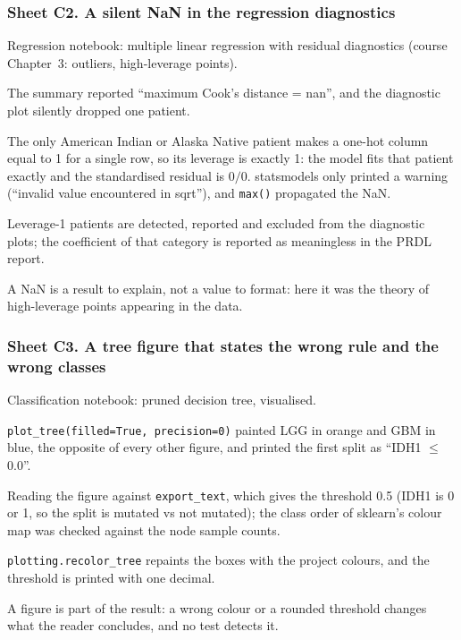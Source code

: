 \subsubsection*{Sheet C2. A silent NaN in the regression diagnostics}
\begin{description}[style=nextline, leftmargin=1.2em]
  \item[Prompt] Regression notebook: multiple linear regression with residual diagnostics (course
        Chapter~3: outliers, high-leverage points).
  \item[Faulty output] The summary reported ``maximum Cook's distance = nan'', and the diagnostic plot
        silently dropped one patient.
  \item[Proof] The only American Indian or Alaska Native patient makes a one-hot column equal to 1 for a
        single row, so its leverage is exactly 1: the model fits that patient exactly and the
        standardised residual is $0/0$. statsmodels only printed a warning (``invalid value encountered
        in sqrt''), and \texttt{max()} propagated the NaN.
  \item[Correction] Leverage-1 patients are detected, reported and excluded from the diagnostic plots;
        the coefficient of that category is reported as meaningless in the PRDL report.
  \item[Reproduction] 
  \item[Reflection] A NaN is a result to explain, not a value to format: here it was the theory of
        high-leverage points appearing in the data.
\end{description}

\subsubsection*{Sheet C3. A tree figure that states the wrong rule and the wrong classes}
\begin{description}[style=nextline, leftmargin=1.2em]
  \item[Prompt] Classification notebook: pruned decision tree, visualised.
  \item[Faulty output] \texttt{plot\_\allowbreak{}tree(filled=True, precision=0)} painted LGG in orange and GBM in
        blue, the opposite of every other figure, and printed the first split as
        ``IDH1 $\leq$ 0.0''.
  \item[Proof] Reading the figure against \texttt{export\_text}, which gives the threshold 0.5 (IDH1 is
        0 or 1, so the split is mutated vs not mutated); the class order of sklearn's colour map was
        checked against the node sample counts.
  \item[Correction] \texttt{plotting.\allowbreak{}recolor\_\allowbreak{}tree} repaints the boxes with the project colours, and
        the threshold is printed with one decimal.
  \item[Reproduction] 
  \item[Reflection] A figure is part of the result: a wrong colour or a rounded threshold changes what
        the reader concludes, and no test detects it.
\end{description}

